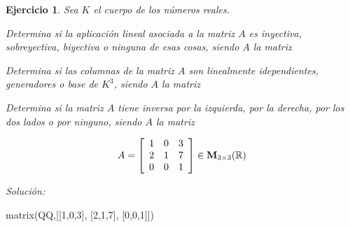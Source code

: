 \documentclass[12pt]{amsart}
\newtheorem{ejer}{Ejercicio}
\begin{document}
\begin{ejer} Sea $K$ el cuerpo de los n\'umeros reales.
\newline
\noindent\begin{minipage}{\textwidth}
\begin{tcolorbox}[colback = green!20!white,title=Versión Aplicaciones]
Determina si la aplicaci\'on lineal asociada a la matriz $A$ es inyectiva, sobreyectiva, biyectiva o ninguna de esas cosas, siendo $A$ la matriz \end{tcolorbox}
\end{minipage} \newline
\noindent\begin{minipage}{\textwidth}
\begin{tcolorbox}[colback = blue!20!white,title=Versión Vectores]
Determina si las columnas de la matriz $A$ son linealmente idependientes, generadores o base de $K^{3}$, siendo $A$ la matriz \end{tcolorbox}
\end{minipage} \newline
\noindent\begin{minipage}{\textwidth} 
\begin{tcolorbox}[colback = red!20!white,title=Versión Inversas]
Determina si la matriz $A$ tiene inversa por la izquierda, por la derecha, por los dos lados o por ninguno, siendo $A$ la matriz 
\end{tcolorbox}
\end{minipage}
\[ A = \left[\begin{array}{rrr}
1 & 0 & 3 \\
2 & 1 & 7 \\
0 & 0 & 1
\end{array}\right] \in {\bf M}_{3\times 3}({\mathbb R})\]
\end{ejer}

{\it Soluci\'on:}

\begin{sageblock}
matrix(QQ,[[1,0,3],
[2,1,7],
[0,0,1]])
\end{sageblock}

\end{document}
